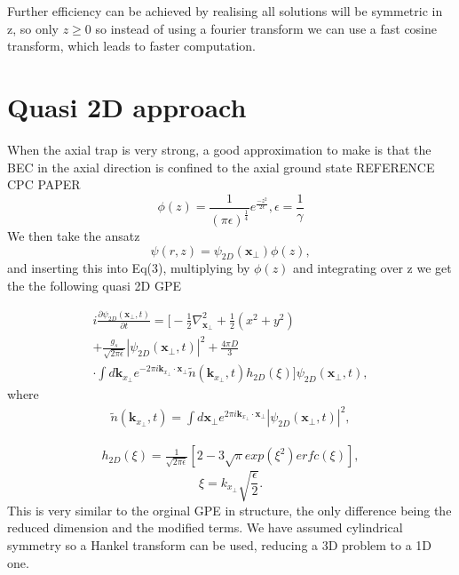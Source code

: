 \documentclass[10pt]{article}
\begin{document}
\begin{multicols}{2}
 Further efficiency can be achieved by realising all solutions will be symmetric in z, so only $z\geqslant0$ so instead of using a fourier transform we can use a fast cosine transform, which leads to faster computation.

\section{Quasi 2D approach}
When the axial trap is very strong, a good approximation to make is that the BEC in the axial direction is confined to the axial ground state REFERENCE CPC PAPER
 \begin{equation}
\phi(z) = \frac{1}{(\pi\epsilon)^{\frac{1}{4}}}e^{\frac{-z^{2}}{2\epsilon}}, \epsilon = \frac{1}{\gamma}
\end{equation}
We then take the ansatz 
 \begin{equation}
\psi(r,z) = \psi_{2D}(\textbf{x}_{\perp})\phi(z),
\end{equation}
and inserting this into Eq(3), multiplying by $\phi(z)$ and integrating over z we get the the following quasi 2D GPE




\begin{multline}
i\frac{\partial \psi_{2D}(\textbf{x}_{\perp},t)}{\partial t}=\bigg[-\frac{1}{2}\nabla_{\textbf{x}_{\perp}}^2 + \frac{1}{2}(x^2+y^2) \\+\frac{g_{s}}{\sqrt{2\pi\epsilon}}|\psi_{2D}(\textbf{x}_{\perp},t)|^2
+\frac{4\pi D}{3}\\\cdot\int d\textbf{k}_{x_{\perp}}e^{-2\pi i\textbf{k}_{x_{\perp}}\cdotp \textbf{x}_{\perp}}\tilde{n}(\textbf{k}_{x_{\perp}},t)h_{2D}(\xi)\bigg]\psi_{2D}(\textbf{x}_{\perp},t),
\end{multline}
where 
\begin{multline}
\tilde{n}(\textbf{k}_{x_{\perp}},t) = \int d\textbf{x}_{\perp}e^{2\pi i\textbf{k}_{x_{\perp}}\cdotp \textbf{x}_{\perp}}|\psi_{2D}(\textbf{x}_{\perp},t)|^2,
\end{multline}

\begin{multline}
h_{2D}(\xi)=\frac{1}{\sqrt{2\pi\epsilon}}[2-3\sqrt{\pi}exp(\xi^2)erfc(\xi)],              
\end{multline}
\begin{equation}
\xi = k_{x_{\perp}}\sqrt{\frac{\epsilon}{2}}.             
\end{equation}
This is very similar to the orginal GPE in structure, the only difference being the reduced dimension and the modified terms. We have assumed cylindrical symmetry so a Hankel transform can be used, reducing a 3D problem to a 1D one. 


\end{multicols}
\end{document}
